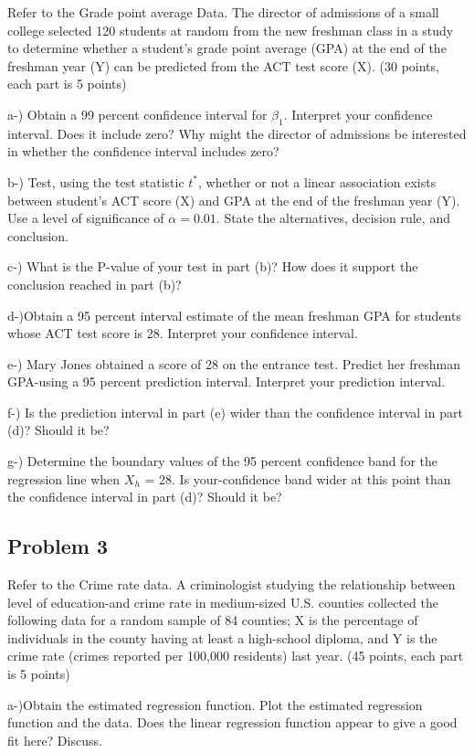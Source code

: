 \documentclass[]{article}
\begin{document}
Refer to the Grade point average Data. The director of admissions of a
small college selected 120 students at random from the new freshman
class in a study to determine whether a student's grade point average
(GPA) at the end of the freshman year (Y) can be predicted from the ACT
test score (X). (30 points, each part is 5 points)

a-) Obtain a 99 percent confidence interval for \(\beta_{1}\). Interpret
your confidence interval. Does it include zero? Why might the director
of admissions be interested in whether the confidence interval includes
zero?

b-) Test, using the test statistic \(t^{*}\), whether or not a linear
association exists between student's ACT score (X) and GPA at the end of
the freshman year (Y). Use a level of significance of \(\alpha=0.01\).
State the alternatives, decision rule, and conclusion.

c-) What is the P-value of your test in part (b)? How does it support
the conclusion reached in part (b)?

d-)Obtain a 95 percent interval estimate of the mean freshman GPA for
students whose ACT test score is 28. Interpret your confidence interval.

e-) Mary Jones obtained a score of 28 on the entrance test. Predict her
freshman GPA-using a 95 percent prediction interval. Interpret your
prediction interval.

f-) Is the prediction interval in part (e) wider than the confidence
interval in part (d)? Should it be?

g-) Determine the boundary values of the 95 percent confidence band for
the regression line when \(X_{h}\) = 28. Is your-confidence band wider
at this point than the confidence interval in part (d)? Should it be?

\hypertarget{problem-3}{%
\subsection{Problem 3}\label{problem-3}}

Refer to the Crime rate data. A criminologist studying the relationship
between level of education-and crime rate in medium-sized U.S. counties
collected the following data for a random sample of 84 counties; X is
the percentage of individuals in the county having at least a
high-school diploma, and Y is the crime rate (crimes reported per
100,000 residents) last year. (45 points, each part is 5 points)

a-)Obtain the estimated regression function. Plot the estimated
regression function and the data. Does the linear regression function
appear to give a good fit here? Discuss.
\end{document}
